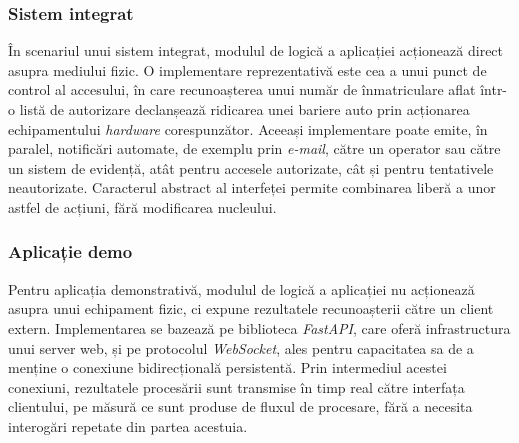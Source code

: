 \subsubsection{Sistem integrat}
\indent\par
În scenariul unui sistem integrat, modulul de logică a aplicației acționează direct asupra mediului fizic. O implementare reprezentativă este cea a unui punct de control al accesului, în care recunoașterea unui număr de înmatriculare aflat într-o listă de autorizare declanșează ridicarea unei bariere auto prin acționarea echipamentului \textit{hardware} corespunzător. Aceeași implementare poate emite, în paralel, notificări automate, de exemplu prin \textit{e-mail}, către un operator sau către un sistem de evidență, atât pentru accesele autorizate, cât și pentru tentativele neautorizate. Caracterul abstract al interfeței permite combinarea liberă a unor astfel de acțiuni, fără modificarea nucleului.

\subsubsection{Aplicație demo}
\indent\par
Pentru aplicația demonstrativă, modulul de logică a aplicației nu acționează asupra unui echipament fizic, ci expune rezultatele recunoașterii către un client extern. Implementarea se bazează pe biblioteca \textit{FastAPI}, care oferă infrastructura unui server web, și pe protocolul \textit{WebSocket}, ales pentru capacitatea sa de a menține o conexiune bidirecțională persistentă. Prin intermediul acestei conexiuni, rezultatele procesării sunt transmise în timp real către interfața clientului, pe măsură ce sunt produse de fluxul de procesare, fără a necesita interogări repetate din partea acestuia.
